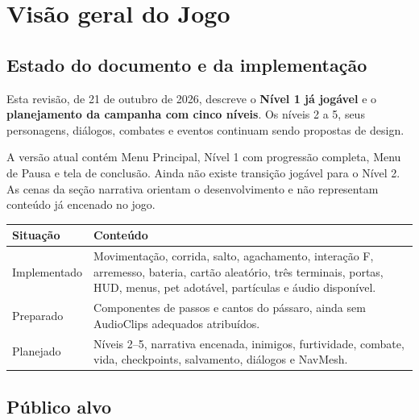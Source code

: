 \documentclass[12pt,a4paper]{article}
\begin{document}
\tableofcontents
\clearpage

\setcounter{section}{1}


\section{Visão geral do Jogo}

\subsection*{Estado do documento e da implementação}

Esta revisão, de 21 de outubro de 2026, descreve o \textbf{Nível 1
já jogável} e o \textbf{planejamento da campanha com cinco níveis}.
Os níveis 2 a 5, seus personagens, diálogos, combates e eventos
continuam sendo propostas de design.

A versão atual contém Menu Principal, Nível 1 com progressão completa,
Menu de Pausa e tela de conclusão. Ainda não existe transição jogável
para o Nível 2. As cenas da seção narrativa orientam o desenvolvimento
e não representam conteúdo já encenado no jogo.

\begin{center}
\begin{tabularx}{\textwidth}{|p{3cm}|X|}
\hline
\textbf{Situação} & \textbf{Conteúdo}\\
\hline
Implementado & Movimentação, corrida, salto, agachamento, interação F,
arremesso, bateria, cartão aleatório, três terminais, portas, HUD,
menus, pet adotável, partículas e áudio disponível.\\
\hline
Preparado & Componentes de passos e cantos do pássaro, ainda sem
AudioClips adequados atribuídos.\\
\hline
Planejado & Níveis 2--5, narrativa encenada, inimigos, furtividade,
combate, vida, checkpoints, salvamento, diálogos e NavMesh.\\
\hline
\end{tabularx}
\end{center}



\subsection{Público alvo}
\end{document}
